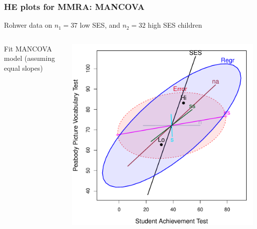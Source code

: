 \begin{frame}
  \frametitle{HE plots for MMRA: MANCOVA}
  \begin{itemize*}
	\item Rohwer data on $n_1=37$ low SES, and $n_2=32$ high SES children
  \end{itemize*}
  \begin{columns}
  	\begin{column}[T]{.4\textwidth}
	\begin{itemize*}
	  \item Fit MANCOVA model (assuming equal slopes)
	\end{itemize*}
	\end{column}
  	\begin{column}[T]{.6\textwidth}
	  \includegraphics[width=\textwidth,clip]{figures/rohwer-mreg3}
	\end{column}
  \end{columns}
\end{frame}

%

